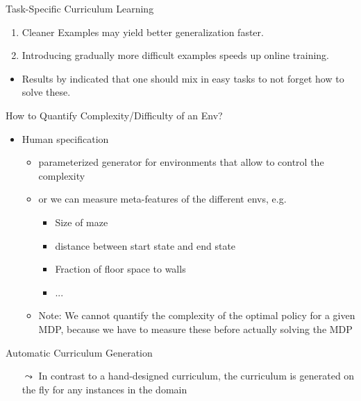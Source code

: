 \begin{frame}[c]{Task-Specific Curriculum Learning~}
	
	
	\begin{enumerate}
		\item Cleaner Examples may yield better generalization faster.
		\item Introducing gradually more difficult examples speeds up online training.
	\end{enumerate}

	\begin{itemize}
		\item Results by  indicated that one should mix in easy tasks to not forget how to solve these.
	\end{itemize}

	
\end{frame}
\begin{frame}[c]{How to Quantify Complexity/Difficulty of an Env?}
	
	\begin{itemize}
		\item Human specification
		\begin{itemize}
			\item parameterized generator for environments that allow to control the complexity 
			\item or we can measure meta-features of the different envs, e.g.
			\begin{itemize}
				\item Size of maze
				\item distance between start state and end state
				\item Fraction of floor space to walls
				\item ...
			\end{itemize}
			\item Note: We cannot quantify the complexity of the optimal policy for a given MDP, because we have to measure these before actually solving the MDP
		\end{itemize}
	\end{itemize}
	

\end{frame}
\begin{frame}[c]{Automatic Curriculum Generation}
	
	\begin{itemize}
		\item[$\leadsto$] In contrast to a hand-designed curriculum, the curriculum is generated on the fly for any instances in the domain
	\end{itemize}
	
\end{frame}

